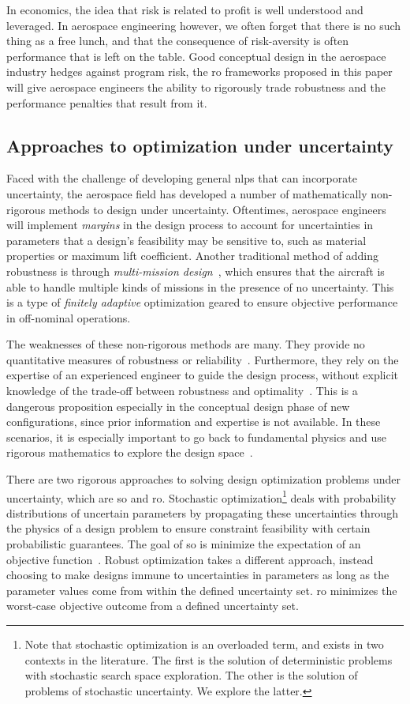 In economics, the idea that risk is related to profit is well understood and leveraged.
In aerospace engineering however, we often forget that there is no such thing as a free lunch,
and that the consequence of risk-aversity is often performance that is left on the table.
Good conceptual design in the aerospace industry hedges against program risk,
the \gls{ro} frameworks proposed in this paper will
give aerospace engineers the ability to rigorously trade robustness and the performance penalties
that result from it.

\subsection{Approaches to optimization under uncertainty}

Faced with the challenge of developing general \gls{nlp}s that can incorporate uncertainty,
the aerospace field has developed a number of mathematically non-rigorous methods to
design under uncertainty. Oftentimes, aerospace engineers will implement
\textit{margins} in the design process to account for uncertainties in parameters that a design's feasibility
may be sensitive to, such as material properties or maximum lift coefficient.
Another traditional method of adding robustness is through \textit{multi-mission design}~\cite{York2018},
which ensures that the aircraft is able to handle
multiple kinds of missions in the presence of no uncertainty. This is a type of \textit{finitely
adaptive} optimization geared to ensure objective performance in off-nominal operations.

The weaknesses of these non-rigorous methods are many. They provide no quantitative measures of
robustness or reliability~\cite{Zang2002}. Furthermore, they rely on the expertise of an experienced
engineer to guide the design process, without explicit knowledge of the trade-off between
robustness and optimality~\cite{Yao2011}. This is a dangerous proposition especially in the
conceptual design phase of new configurations, since prior information and expertise is not
available. In these scenarios, it is especially important to go back to fundamental physics
and use rigorous mathematics to explore the design space~\cite{York2018}.

There are two rigorous approaches to solving design optimization problems under uncertainty,
which are \gls{so} and \gls{ro}. Stochastic optimization\footnote{Note that stochastic
optimization is an overloaded term, and exists in two contexts in the literature. The first is the solution
of deterministic problems with stochastic search space exploration. The other is the solution
of problems of stochastic uncertainty. We explore the latter.}
deals with probability distributions of
uncertain parameters by propagating these uncertainties through the
physics of a design problem to ensure constraint feasibility with certain probabilistic guarantees.
The goal of \gls{so} is minimize the expectation of an objective function~\cite{Diwekar2008}.
Robust optimization takes a different approach, instead choosing to make designs immune to
uncertainties in parameters as long as the parameter values come from within the defined
uncertainty set. \gls{ro} minimizes the worst-case objective outcome from a defined uncertainty set.

